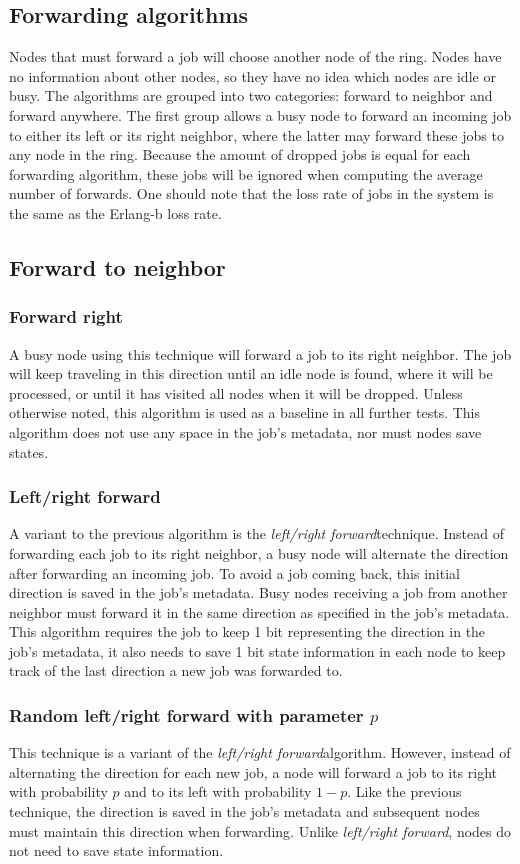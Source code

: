 \documentclass[10pt,a4paper]{article}
\newcommand{\LRF}{\textit{left/right forward\xspace}}
\begin{document}
\subsection{Forwarding algorithms}
Nodes that must forward a job will choose another node of the ring. Nodes have no information about other nodes, so they have no idea which nodes are idle or busy. The algorithms are grouped into two categories: forward to neighbor and forward anywhere.
The first group allows a busy node to forward an incoming job to either its left or its right neighbor, where the latter may forward these jobs to any node in the ring. 
Because the amount of dropped jobs is equal for each forwarding algorithm, these jobs will be ignored when computing the average number of forwards. One should note that the loss rate of jobs in the system is the same as the Erlang-b loss rate.

\subsection{Forward to neighbor}
\subsubsection*{Forward right}
A busy node using this technique will forward a job to its right neighbor. The job will keep traveling in this direction until an idle node is found, where it will be processed, or until it has visited all nodes when it will be dropped. Unless otherwise noted, this algorithm is used as a baseline in all further tests. This algorithm does not use any space in the job's metadata, nor must nodes save states.

\subsubsection*{Left/right forward}
A variant to the previous algorithm is the \LRF technique. Instead of forwarding each job to its right neighbor, a busy node will alternate the direction after forwarding an incoming job. To avoid a job coming back, this initial direction is saved in the job's metadata. Busy nodes receiving a job from another neighbor must forward it in the same direction as specified in the job's metadata. This algorithm requires the job to keep 1 bit representing the direction in the job's metadata, it also needs to save 1 bit state information in each node to keep track of the last direction a new job was forwarded to.

\subsubsection*{Random left/right forward with parameter $p$}
This technique is a variant of the \LRF algorithm. However, instead of alternating the direction for each new job, a node will forward a job to its right with probability $p$ and to its left with probability $1-p$. Like the previous technique, the direction is saved in the job's metadata and subsequent nodes must maintain this direction when forwarding. Unlike \LRF, nodes do not need to save state information.
\end{document}
